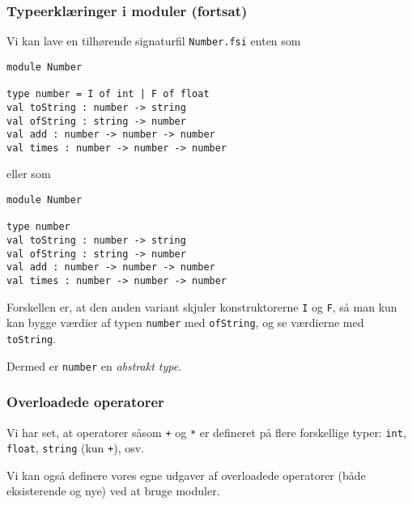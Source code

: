 \documentclass{beamer}
\begin{document}
\begin{frame}[fragile=singleslide]
\frametitle{Typeerklæringer i moduler (fortsat)}

Vi kan lave en tilhørende signaturfil \texttt{Number.fsi} enten som

\renewcommand{\baselinestretch}{0.75}
{\footnotesize
\begin{verbatim}
module Number

type number = I of int | F of float
val toString : number -> string
val ofString : string -> number
val add : number -> number -> number
val times : number -> number -> number
\end{verbatim}
}
\renewcommand{\baselinestretch}{1.0}

eller som

\renewcommand{\baselinestretch}{0.75}
{\footnotesize
\begin{verbatim}
module Number

type number
val toString : number -> string
val ofString : string -> number
val add : number -> number -> number
val times : number -> number -> number
\end{verbatim}
}
\renewcommand{\baselinestretch}{1.0}

Forskellen er, at den anden variant skjuler konstruktorerne \texttt{I}
og \texttt{F}, så man kun kan bygge værdier af typen \texttt{number} med
\texttt{ofString}, og se værdierne med \texttt{toString}.

Dermed er \texttt{number} en \emph{abstrakt type}.
\end{frame}

\begin{frame}%
\frametitle{Overloadede operatorer}

Vi har set, at operatorer såsom \texttt{+} og \texttt{*} er defineret
på flere forskellige typer: \texttt{int}, \texttt{float},
\texttt{string} (kun \texttt{+}), osv.

\vspace{1ex}

Vi kan også definere vores egne udgaver af overloadede operatorer
(både eksisterende og nye) ved at bruge moduler.

\end{frame}
\end{document}
